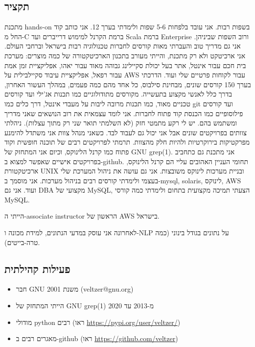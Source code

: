 \documentclass[
  hebrew,
]{article}
\providecommand{\tightlist}{%
  \setlength{\itemsep}{0pt}\setlength{\parskip}{0pt}}
\begin{document}
\subsection{תקציר}\label{ux5eaux5e7ux5e6ux5d9ux5e8}

מתכנת hands-on בשפות רבות. אני עובד בלפחות 5-6 שפות ולימדתי בערך 12. אני
כותב קוד החל מ-C ברמת הקרנל למימוש דרייברים ועד Scala ברמת Enterprise
ורוב השפות שביניהן. אני גם מדריך טוב והעברתי מאות קורסים לחברות
טכנולוגיה רבות בישראל וברחבי העולם. אני ארכיטקט ולא רק מתכנת, והייתי
מעורב בתכנון הארכיטקטורה של כמה מוצרים: מערכת בית חכם עבור אינטל, אתר
בעל יכולת סקיילינג גבוהה מאוד עבור יאהו, אפליקציית זמן אמת עבור רפאל,
אפליקציית עיבוד סקיילבילית על AWS עבור לקוחות פרטיים שלי ועוד. הדרכתי
בערך 150 קורסים שונים, מבחינת סילבוס, כל אחד מהם כמה פעמים, במהלך העשור
האחרון, בדרך כלל לאנשי מקצוע בתעשייה. מקורסים מתודולוגיים כמו תכנות
אג'ילי ועד קורסים טכניים מאוד, כמו תכנות מרובה ליבות על מעבדי אינטל, דרך
כלים כמו git ועד קורסים פילוסופיים כמו הכנסת קוד פתוח לחברות. אני לומד
עצמאית את רוב הנושאים שאני מדריך ומשתמש בהם. יש לי רקע מתמטי חזק (לא
השלמתי תואר שני רק מתוך עצלות). ניהלתי צוותים בפרויקטים שונים אבל אני
יכול גם לעבוד לבד. כשאני מנהל צוות אני משתדל להימנע מפרקטיקות בירוקרטיות
ולהיות חלק מהצוות. תרמתי לפרויקטים רבים של תוכנה חופשית וקוד פתוח כמו
קרנל הלינוקס, וכיום אני המתחזק של GNU grep(1). אני מתכנת גם כתחביב
בפרויקטים אישיים שאפשר למצוא ב-github. תחומי העניין האהובים עליי הם קרנל
הלינוקס, ארכיטקטורת UNIX ובניית מערכות לינוקס משובצות. אני גם עושה את
ניהול המערכת שלי בעצמי ולימדתי קורסים רבים בניהול מערכות. אני מוסמך
ב-mysql, solaris, לינוקס, AWS ועוד. אני גם DBA מקצועי של MySQL, הצעתי
תמיכה מקצועית בתחום ולימדתי כמה קורסי MySQL.

הייתי ה-associate instructor הראשון של AWS בישראל.

לאחרונה אני עוסק במדעי הנתונים, למידת מכונה ו-NLP על נתונים בגודל בינוני
(כמה טרה-בייטים).

\subsection{פעילות
קהילתית}\label{ux5e4ux5e2ux5d9ux5dcux5d5ux5ea-ux5e7ux5d4ux5d9ux5dcux5eaux5d9ux5ea}

\begin{itemize}
\tightlist
\item
  חבר GNU משנת 2001 (veltzer@gnu.org)
\item
  הייתי המתחזק של GNU grep(1) מ-2013 עד 2020
\item
  מודולי python רבים (ראו \url{https://pypi.org/user/veltzer/})
\item
  מאגרים רבים ב-github (ראו \url{https://github.com/veltzer})
\end{itemize}
\end{document}
